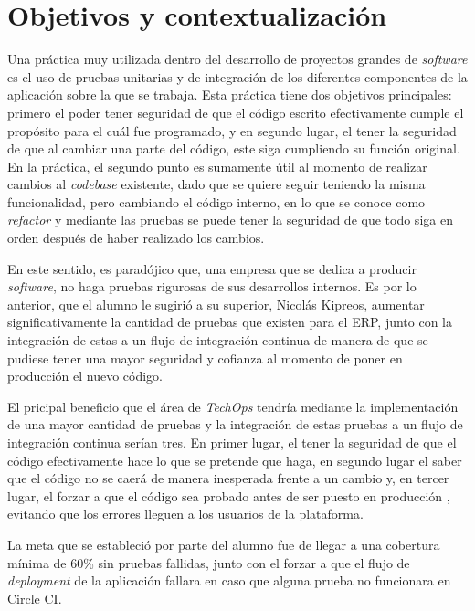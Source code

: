 \textit{}\section{Objetivos y contextualización}

  Una práctica muy utilizada dentro del desarrollo de proyectos grandes de \textit{software} es el uso de pruebas unitarias y de integración de los diferentes componentes de la aplicación sobre la que se trabaja. Esta práctica tiene dos objetivos principales: primero el poder tener seguridad de que el código escrito efectivamente cumple el propósito para el cuál fue programado, y en segundo lugar, el tener la seguridad de que al cambiar una parte del código, este siga cumpliendo su función original. En la práctica, el segundo punto es sumamente útil al momento de realizar cambios al \textit{codebase} existente, dado que se quiere seguir teniendo la misma funcionalidad, pero cambiando el código interno, en lo que se conoce como \textit{refactor} y mediante las pruebas se puede tener la seguridad de que todo siga en orden después de haber realizado los cambios. 
  
  En este sentido, es paradójico que, una empresa que se dedica a producir \textit{software}, no haga pruebas rigurosas de sus desarrollos internos. Es por lo anterior, que el alumno le sugirió a su superior, Nicolás Kipreos, aumentar significativamente la cantidad de pruebas que existen para el ERP, junto con la integración de estas a un flujo de integración continua de manera de que se pudiese tener una mayor seguridad y cofianza al momento de poner en producción el nuevo código.

  El pricipal beneficio que el área de \textit{TechOps} tendría mediante la implementación de una mayor cantidad de pruebas y la integración de estas pruebas a un flujo de integración continua serían tres. En primer lugar, el tener la seguridad de que el código efectivamente hace lo que se pretende que haga, en segundo lugar el saber que el código no se caerá de manera inesperada frente a un cambio y, en tercer lugar, el forzar a que el código sea probado antes de ser puesto en producción \cite{ibm_testing}, evitando que los errores lleguen a los usuarios de la plataforma.

  La meta que se estableció por parte del alumno fue de llegar a una cobertura mínima de 60\% sin pruebas fallidas, junto con el forzar a que el flujo de \textit{deployment} de la aplicación fallara en caso que alguna prueba no funcionara en Circle CI.

